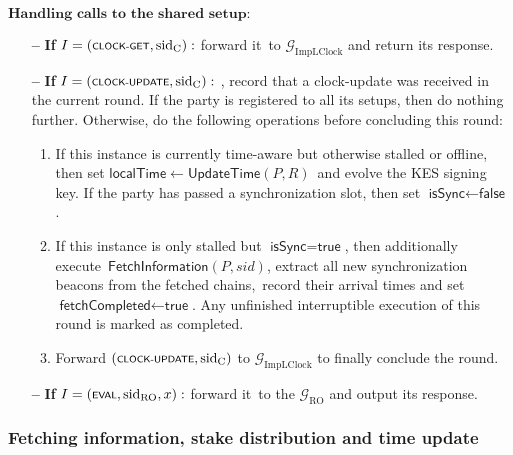 \begin{protocol}
\begin{algorithmic}
        \State $\textbf{Handling calls to the shared setup:}$
        \begin{itemize}
            \item[\textbf{--}] \textbf{If} $I = (\textsf{\scriptsize{CLOCK-GET}}, \text{sid}_\text{C}):$ forward it\
            to $\mathcal{G}_{\text{ImpLClock}}$ and return its response.
            \item[\textbf{--}] \textbf{If} $I = (\textsf{\scriptsize{CLOCK-UPDATE}}, \text{sid}_\text{C}):$ ,  record that a clock-update was received in the current round.
            If the party is registered to all its setups,  then do nothing further.
            Otherwise,  do the following operations before concluding this round:
            \begin{enumerate}
                \item If this instance is currently time-aware but otherwise stalled or offline, then set $\textsf{localTime} \leftarrow \textsf{UpdateTime}(P, R)$\
                and evolve the KES signing key.
                If the party has passed a synchronization slot, then set $\textsf{isSync}  \leftarrow  \textsf{false}$.
                \item If this instance is only stalled but $\textsf{isSync}  =  \textsf{true}$, then additionally execute\
                \hyperref[apndx:fetch-info-protocol]{$\textsf{FetchInformation}$}$(P, sid)$, extract all new synchronization beacons from the fetched chains,\
                record their arrival times and set $\textsf{fetchCompleted}  \leftarrow  \textsf{true}$.
                Any unfinished interruptible execution of this round is marked as completed.
                \item Forward $(\textsf{\scriptsize{CLOCK-UPDATE}}, \text{sid}_\text{C})$ to $\mathcal{G}_{\text{ImpLClock}}$ to finally conclude the round.
            \end{enumerate}
            \item[\textbf{--}] \textbf{If} $I = (\textsf{\scriptsize{EVAL}}, \text{sid}_{\text{RO}}, x):$ forward it\
            to the $\mathcal{G}_{\text{RO}}$ and output its response.
        \end{itemize}


    \end{algorithmic}\label{alg:spectrum-protocol}
\end{protocol}

\subsubsection{Fetching information, stake distribution and time update}


